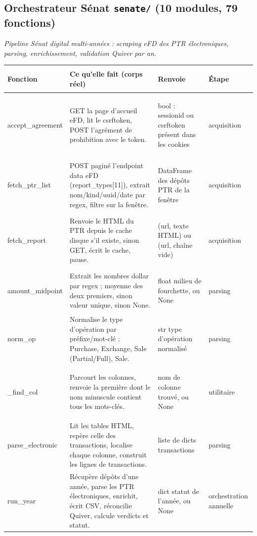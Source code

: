 \documentclass[11pt,a4paper]{article}
\makeatletter
\newenvironment{fnt}{%
  \par\footnotesize
  \setlength{\tabcolsep}{3pt}%
  \begin{longtable}{@{}>{\ttfamily\scriptsize\raggedright\arraybackslash}p{3.0cm} >{\raggedright\arraybackslash}p{7.5cm} >{\itshape\scriptsize\raggedright\arraybackslash}p{2.7cm} >{\scriptsize\raggedright\arraybackslash}p{1.85cm}@{}}
  \toprule
  \normalfont\bfseries\scriptsize Fonction & \bfseries\scriptsize Ce qu'elle fait (corps réel) &
  \normalfont\bfseries\scriptsize Renvoie & \normalfont\bfseries\scriptsize Étape\\
  \midrule\endhead
}{\bottomrule\end{longtable}\par}
\newcommand{\fnmod}[2]{\par\smallskip\noindent{\ttfamily\bfseries #1}\;\textmd{\itshape\small\textemdash{} #2}\par\nobreak\vspace{2pt}}
\makeatother
\begin{document}
\subsection{Orchestrateur S\'enat \textemdash{} \texttt{senate/} (10 modules, 79 fonctions)}
\fnmod{digital.py}{Pipeline Sénat digital multi-années : scraping eFD des PTR électroniques, parsing, enrichissement, validation Quiver par an.}
\begin{fnt}
accept_\allowbreak agreement & GET la page d'accueil eFD,\allowbreak{} lit le csrftoken,\allowbreak{} POST l'agrément de prohibition avec le token. & bool : sessionid ou csrftoken présent dans les cookies & acquisition \\
fetch_\allowbreak ptr_\allowbreak list & POST paginé l'endpoint data eFD (report_types[11]\allowbreak{})\allowbreak{},\allowbreak{} extrait nom/\allowbreak{}kind/\allowbreak{}uuid/\allowbreak{}date par regex,\allowbreak{} filtre sur la fenêtre. & DataFrame des dépôts PTR de la fenêtre & acquisition \\
fetch_\allowbreak report & Renvoie le HTML du PTR depuis le cache disque s'il existe,\allowbreak{} sinon GET,\allowbreak{} écrit le cache,\allowbreak{} pause. & (url,\allowbreak{} texte HTML)\allowbreak{} ou (url,\allowbreak{} chaîne vide)\allowbreak{} & acquisition \\
amount_\allowbreak midpoint & Extrait les nombres dollar par regex ; moyenne des deux premiers,\allowbreak{} sinon valeur unique,\allowbreak{} sinon None. & float milieu de fourchette,\allowbreak{} ou None & parsing \\
norm_\allowbreak op & Normalise le type d'opération par préfixe/\allowbreak{}mot-clé : Purchase,\allowbreak{} Exchange,\allowbreak{} Sale (Partial/\allowbreak{}Full)\allowbreak{},\allowbreak{} Sale. & str type d'opération normalisé & parsing \\
_\allowbreak find_\allowbreak col & Parcourt les colonnes,\allowbreak{} renvoie la première dont le nom minuscule contient tous les mots-clés. & nom de colonne trouvé,\allowbreak{} ou None & utilitaire \\
parse_\allowbreak electronic & Lit les tables HTML,\allowbreak{} repère celle des transactions,\allowbreak{} localise chaque colonne,\allowbreak{} construit les lignes de transactions. & liste de dicts transactions & parsing \\
run_\allowbreak year & Récupère dépôts d'une année,\allowbreak{} parse les PTR électroniques,\allowbreak{} enrichit,\allowbreak{} écrit CSV,\allowbreak{} réconcilie Quiver,\allowbreak{} calcule verdicts et statut. & dict statut de l'année,\allowbreak{} ou None & orchestration annuelle \\

\end{fnt}
\end{document}
